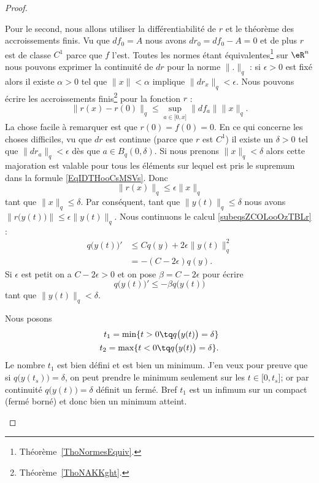 \begin{proof}
\begin{subproof}
		Pour le second, nous allons utiliser la différentiabilité de \( r\) et le théorème des accroissements finis. Vu que \( df_0=A\) nous avons \( dr_0=df_0-A=0\) et de plus \( r\) est de classe \( C^1\) parce que \( f\) l'est. Toutes les normes étant équivalentes\footnote{Théorème~\ref{ThoNormesEquiv}.} sur \( \eR^n\) nous pouvons exprimer la continuité de \( dr\) pour la norme \( \| . \|_q\) : si \( \epsilon>0\) est fixé alors il existe \( \alpha>0\) tel que \( \| x \|<\alpha\) implique \( \| dr_x \|_q<\epsilon\). Nous pouvons écrire les accroissements finis\footnote{Théorème~\ref{ThoNAKKght}.} pour la fonction \( r\) :
		\begin{equation}    \label{EqIDTHooCsMSVs}
			\| r(x)-r(0) \|_q\leq \sup_{a\in\mathopen[ 0 , x \mathclose]}\| df_a \|\| x \|_q.
		\end{equation}
		La chose facile à remarquer est que \( r(0)=f(0)=0\). En ce qui concerne les choses difficiles, vu que \( dr\) est continue (parce que \( r\) est \( C^1\)) il existe un \( \delta>0\) tel que \( \| dr_a \|_q<\epsilon\) dès que \( a\in B_q(0,\delta)\). Si nous prenons \( \| x \|_q<\delta\) alors cette majoration est valable pour tous les éléments sur lequel est pris le supremum dans la formule \eqref{EqIDTHooCsMSVs}. Donc
		\begin{equation}
			\| r(x) \|_q\leq \epsilon\| x \|_q
		\end{equation}
		tant que \( \| x \|_q\leq \delta\). Par conséquent, tant que \(  \| y(t) \|_q\leq \delta\) nous avons \( \| r\big( y(t) \big) \|\leq \epsilon\| y(t) \|_q\). Nous continuons le calcul \eqref{subeqsZCOLooOzTBLr} :
		\begin{subequations}
			\begin{align}
				q\big( y(t) \big)' & \leq Cq(y)+2\epsilon\| y(t) \|_q^2 \\
				                   & =-(C-2\epsilon)q(y).
			\end{align}
		\end{subequations}
		Si \( \epsilon\) est petit on a \( C-2\epsilon >0 \) et on pose \( \beta=C-2\epsilon\) pour écrire
		\begin{equation}    \label{EqEYJIooHvSBic}
			q\big( y(t) \big)'\leq -\beta q\big( y(t) \big)
		\end{equation}
		tant que \( \| y(t) \|_q<\delta\).

		Nous posons
		\begin{subequations}    \label{subeqsFNPJooERJkxO}
			\begin{align}
				t_1=\min\{ t>0\tq q\big( y(t) \big)=\delta \} \\
				t_2=\max\{ t<0\tq q\big( y(t) \big)=\delta \}.
			\end{align}
		\end{subequations}
		Le nombre \( t_1\) est bien défini et est bien un minimum. J'en veux pour preuve que si \( q\big( y(t_s) \big)=\delta\), on peut prendre le minimum seulement sur les \( t\in\mathopen[ 0 , t_s \mathclose]\); or par continuité \( q\big( y(t) \big)=\delta\) définit un fermé. Bref \( t_1\) est un infimum sur un compact (fermé borné) et donc bien un minimum atteint.


\end{subproof}
\end{proof}
